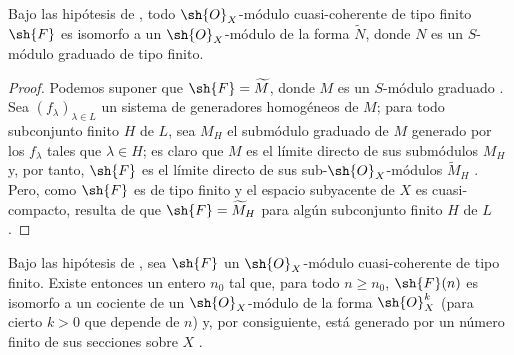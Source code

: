 \documentclass[oneside,10pt]{amsart}
\renewcommand{\geq}{\geqslant}
\let\EGAOriginalLabel\label
\renewcommand{\label}[1]{\phantomsection\EGAOriginalLabel{#1}}
\begin{document}
\begin{corollary}[2.7.8]
\label{II.2.7.8}
Bajo las hipótesis de , todo $\sh{O}_X$-módulo cuasi-coherente de tipo finito $\sh{F}$ es isomorfo a un $\sh{O}_X$-módulo de la forma $\widetilde{N}$, donde $N$ es un $S$-módulo graduado de tipo finito.
\end{corollary}

\begin{proof}
Podemos suponer que $\sh{F}=\widetilde{M}$, donde $M$ es un $S$-módulo graduado .
Sea $(f_\lambda)_{\lambda\in L}$ un sistema de generadores homogéneos de $M$; para todo subconjunto finito $H$ de $L$, sea $M_H$ el submódulo graduado de $M$ generado por los $f_\lambda$ tales que $\lambda\in H$; es claro que $M$ es el límite directo de sus submódulos $M_H$ y, por tanto, $\sh{F}$ es el límite directo de sus sub-$\sh{O}_X$-módulos $\widetilde M_H$ .
Pero, como $\sh{F}$ es de tipo finito y el espacio subyacente de $X$ es cuasi-compacto, resulta de  que $\sh{F}=\widetilde M_H$ para algún subconjunto finito $H$ de $L$.
\end{proof}

\begin{corollary}[2.7.9]
\label{II.2.7.9}
Bajo las hipótesis de , sea $\sh{F}$ un $\sh{O}_X$-módulo cuasi-coherente de tipo finito.
Existe entonces un entero $n_0$ tal que, para todo $n\geq n_0$, $\sh{F}(n)$ es isomorfo a un cociente de un $\sh{O}_X$-módulo de la forma $\sh{O}_X^k$ (para cierto $k>0$ que depende de $n$) y, por consiguiente, está generado por un número finito de sus secciones sobre $X$ .
\end{corollary}
\end{document}
